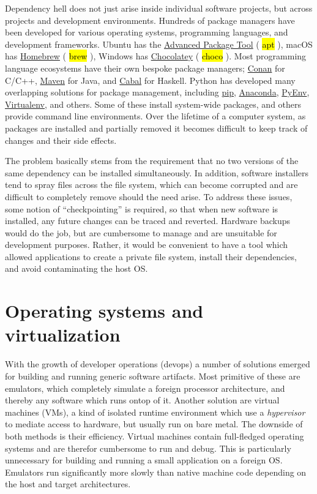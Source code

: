 \documentclass[12pt,initial,twoside,maitrise]{dms}
\newcommand{\inline}[1]{%
    \begingroup%
    \sethlcolor{slightgray}%
    \hl{\ttfamily\footnotesize #1}%
    \endgroup
}
\numberwithin{equation}{section}
\numberwithin{table}{chapter}
\numberwithin{figure}{chapter}
\begin{document}
Dependency hell does not just arise inside individual software projects, but across projects and development environments. Hundreds of package managers have been developed for various operating systems, programming languages, and development frameworks. Ubuntu has the \href{https://help.ubuntu.com/lts/serverguide/apt.html}{Advanced Package Tool} (\inline{apt}), macOS has \href{https://brew.sh/}{Homebrew} (\inline{brew}), Windows has \href{https://chocolatey.org/}{Chocolatey} (\inline{choco}). Most programming language ecosystems have their own bespoke package managers; \href{https://conan.io/}{Conan} for C/C++, \href{https://maven.apache.org}{Maven} for Java, and \href{https://www.haskell.org/cabal/}{Cabal} for Haskell. Python has developed many overlapping solutions for package management, including \href{https://pypi.org/project/pip/}{pip}, \href{https://www.anaconda.com/}{Anaconda}, \href{https://github.com/pyenv/pyenv}{PyEnv}, \href{https://virtualenv.pypa.io/}{Virtualenv}, and others. Some of these install system-wide packages, and others provide command line environments. Over the lifetime of a computer system, as packages are installed and partially removed it becomes difficult to keep track of changes and their side effects.

The problem basically stems from the requirement that no two versions of the same dependency can be installed simultaneously. In addition, software installers tend to spray files across the file system, which can become corrupted and are difficult to completely remove should the need arise. To address these issues, some notion of ``checkpointing'' is required, so that when new software is installed, any future changes can be traced and reverted. Hardware backups would do the job, but are cumbersome to manage and are unsuitable for development purposes. Rather, it would be convenient to have a tool which allowed applications to create a private file system, install their dependencies, and avoid contaminating the host OS.

\section{Operating systems and virtualization}\label{sec:os-and-virtualization}

With the growth of developer operations (devops) a number of solutions emerged for building and running generic software artifacts. Most primitive of these are emulators, which completely simulate a foreign processor architecture, and thereby any software which runs ontop of it. Another solution are virtual machines (VMs), a kind of isolated runtime environment which use a \textit{hypervisor} to mediate access to hardware, but usually run on bare metal. The downside of both methods is their efficiency. Virtual machines contain full-fledged operating systems and are therefor cumbersome to run and debug. This is particularly unnecessary for building and running a small application on a foreign OS. Emulators run significantly more slowly than native machine code depending on the host and target architectures.
\end{document}
